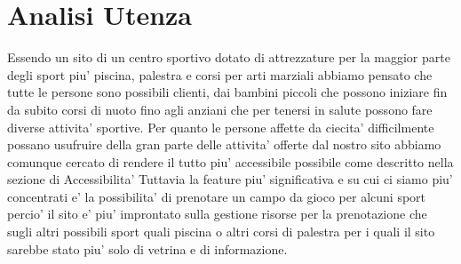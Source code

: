 \section{Analisi Utenza}

Essendo un sito di un centro sportivo dotato di attrezzature per la maggior parte degli sport piu' piscina, palestra e corsi per arti marziali abbiamo pensato che tutte le persone sono possibili clienti, dai bambini piccoli che possono iniziare fin da subito corsi di nuoto fino agli anziani che per tenersi in salute possono fare diverse attivita' sportive.\newline
Per quanto le persone affette da ciecita' difficilmente possano usufruire della gran parte delle attivita' offerte dal nostro sito abbiamo comunque cercato di rendere il tutto piu' accessibile possibile come descritto nella sezione di Accessibilita'\newline
Tuttavia la feature piu' significativa e su cui ci siamo piu' concentrati e' la possibilita' di prenotare un campo da gioco per alcuni sport percio' il sito e' piu' improntato sulla gestione risorse per la prenotazione che sugli altri possibili sport quali piscina o altri corsi di palestra per i quali il sito sarebbe stato piu' solo di vetrina e di informazione.
